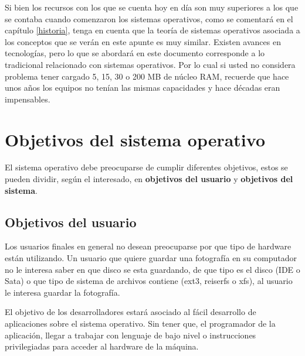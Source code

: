 Si bien los recursos con los que se cuenta hoy en día son muy superiores a los
que se contaba cuando comenzaron los sistemas operativos, como se comentará en
el capítulo \ref{historia}, tenga en cuenta que la teoría de sistemas operativos
asociada a los conceptos que se verán en este apunte es muy similar. Existen
avances en tecnologías, pero lo que se abordará en este documento corresponde a
lo tradicional relacionado con sistemas operativos. Por lo cual si usted no
considera problema tener cargado 5, 15, 30 o 200 MB de núcleo RAM, recuerde que
hace unos años los equipos no tenían las mismas capacidades y hace décadas eran
impensables.

\section{Objetivos del sistema operativo}

El sistema operativo debe preocuparse de cumplir diferentes objetivos, estos se
pueden dividir, según el interesado, en \textbf{objetivos del usuario} y
\textbf{objetivos del sistema}.

\subsection{Objetivos del usuario}

Los usuarios finales en general no desean preocuparse por que tipo de hardware
están utilizando. Un usuario que quiere guardar una fotografía en su computador
no le interesa saber en que disco se esta guardando, de que tipo es el disco
(IDE o Sata) o que tipo de sistema de archivos contiene (ext3, reiserfs o xfs),
al usuario le interesa guardar la fotografía.

El objetivo de los desarrolladores estará asociado al fácil desarrollo de
aplicaciones sobre el sistema operativo. Sin tener que, el programador de la
aplicación, llegar a trabajar con lenguaje de bajo nivel o instrucciones
privilegiadas para acceder al hardware de la máquina.

